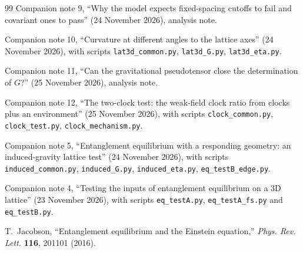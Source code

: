 \documentclass[11pt]{article}
\theoremstyle{plain}
\theoremstyle{definition}
\theoremstyle{remark}
\begin{document}
\begin{thebibliography}{99}
Companion note 9, ``Why the model expects fixed-spacing cutoffs to fail and covariant ones to pass'' (24 November 2026), analysis note.

Companion note 10, ``Curvature at different angles to the lattice axes'' (24 November 2026), with scripts \texttt{lat3d\_common.py}, \texttt{lat3d\_G.py}, \texttt{lat3d\_eta.py}.

Companion note 11, ``Can the gravitational pseudotensor close the determination of $G$?'' (25 November 2026), analysis note.

Companion note 12, ``The two-clock test: the weak-field clock ratio from clocks plus an environment'' (25 November 2026), with scripts \texttt{clock\_common.py}, \texttt{clock\_test.py}, \texttt{clock\_mechanism.py}.

Companion note 5, ``Entanglement equilibrium with a responding geometry: an induced-gravity lattice test'' (24 November 2026), with scripts \texttt{induced\_common.py}, \texttt{induced\_G.py}, \texttt{induced\_eta.py}, \texttt{eq\_testB\_edge.py}.

Companion note 4, ``Testing the inputs of entanglement equilibrium on a 3D lattice'' (23 November 2026), with scripts \texttt{eq\_testA.py}, \texttt{eq\_testA\_fs.py} and \texttt{eq\_testB.py}.

T.~Jacobson, ``Entanglement equilibrium and the Einstein equation,'' \emph{Phys. Rev. Lett.} \textbf{116}, 201101 (2016).

\end{thebibliography}
\end{document}
